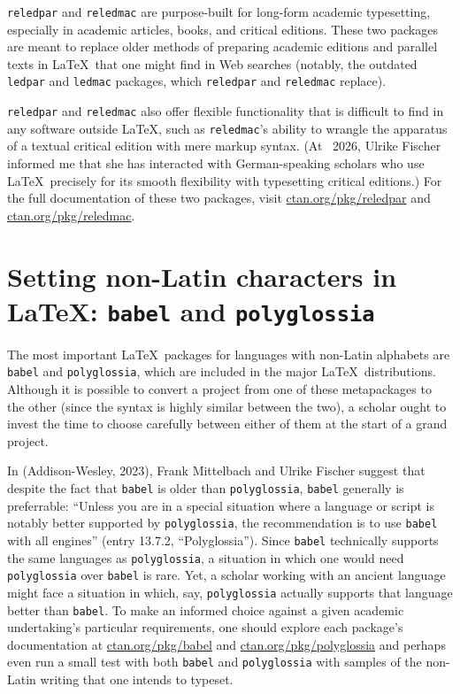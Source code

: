 \documentclass{ltugboat}
\begin{document}
\texttt{reledpar} and \texttt{reledmac} are purpose-built for long-form academic typesetting, especially in academic articles, books, and critical editions. These two packages are meant to replace older methods of preparing academic editions and parallel texts in \LaTeX\ that one might find in Web searches (notably, the outdated \texttt{ledpar} and \texttt{ledmac} packages, which \texttt{reledpar} and \texttt{reledmac} replace).

\texttt{reledpar} and \texttt{reledmac} also offer flexible functionality that is difficult to find in any software outside \LaTeX, such as \texttt{reledmac}'s ability to wrangle the apparatus of a textual critical edition with mere markup syntax. (At \TUG\ 2026, Ulrike Fischer informed me that she has interacted with German-speaking scholars who use \LaTeX\ precisely for its smooth flexibility with typesetting critical editions.) For the full documentation of these two packages, visit \url{ctan.org/pkg/reledpar} and \url{ctan.org/pkg/reledmac}.

\section{Setting non-Latin characters in \LaTeX: \texttt{babel} and \texttt{polyglossia}}

The most important \LaTeX\ packages for languages with non-Latin alphabets are \texttt{babel} and \texttt{polyglossia}, which are included in the major \LaTeX\ distributions. Although it is possible to convert a project from one of these metapackages to the other (since the syntax is highly similar between the two), a scholar ought to invest the time to choose carefully between either of them at the start of a grand project.

In  (Addison-Wesley, 2023), Frank Mittelbach and Ulrike Fischer suggest that despite the fact that \texttt{babel} is older than \texttt{polyglossia}, \texttt{babel} generally is preferrable: ``Unless you are in a special situation where a language or script is notably better supported by \texttt{polyglossia}, the recommendation is to use \texttt{babel} with all engines'' (entry 13.7.2, ``Polyglossia''). Since \texttt{babel} technically supports the same languages as \texttt{polyglossia}, a situation in which one would need \texttt{polyglossia} over \texttt{babel} is rare. Yet, a scholar working with an ancient language might face a situation in which, say, \texttt{polyglossia} actually supports that language better than \texttt{babel}. To make an informed choice against a given academic undertaking's particular requirements, one should explore each package's documentation at \url{ctan.org/pkg/babel} and \url{ctan.org/pkg/polyglossia} \Dash and perhaps even run a small test with both \texttt{babel} and \texttt{polyglossia} with samples of the non-Latin writing that one intends to typeset.
\end{document}
